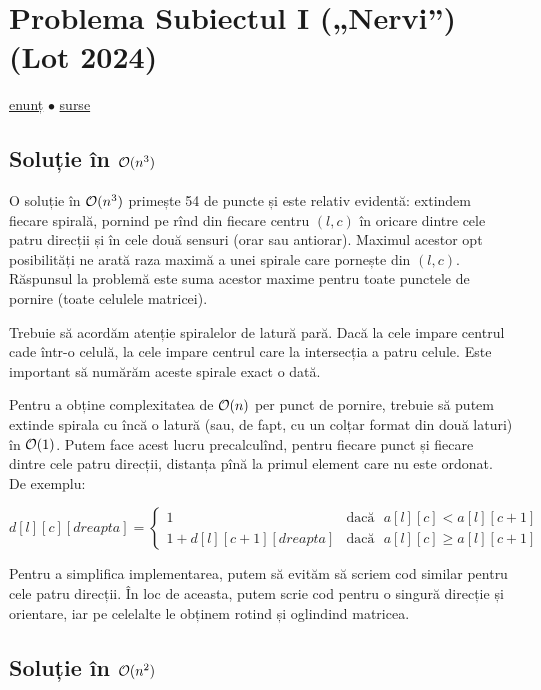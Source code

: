 \documentclass[../main.tex]{subfiles}
\begin{document}
\section{Problema Subiectul I („Nervi”) (Lot 2024)}
\label{problem:subiectul-i}

\href{https://kilonova.ro/problems/2841}{enunț}
$\bullet$
\hyperref[code:subiectul-i]{surse}

\subsection{Soluție în \texorpdfstring{$\mathcal{O}(n^3)$}{O(n3)}}

O soluție în $\mathcal{O}(n^3)$ primește 54 de puncte și este relativ evidentă: extindem fiecare spirală, pornind pe rînd din fiecare centru $(l, c)$ în oricare dintre cele patru direcții și în cele două sensuri (orar sau antiorar). Maximul acestor opt posibilități ne arată raza maximă a unei spirale care pornește din $(l, c)$. Răspunsul la problemă este suma acestor maxime pentru toate punctele de pornire (toate celulele matricei).

Trebuie să acordăm atenție spiralelor de latură pară. Dacă la cele impare centrul cade într-o celulă, la cele impare centrul care la intersecția a patru celule. Este important să numărăm aceste spirale exact o dată.

Pentru a obține complexitatea de $\mathcal{O}(n)$ per punct de pornire, trebuie să putem extinde spirala cu încă o latură (sau, de fapt, cu un colțar format din două laturi) în $\mathcal{O}(1)$. Putem face acest lucru precalculînd, pentru fiecare punct și fiecare dintre cele patru direcții, distanța pînă la primul element care nu este ordonat. De exemplu:

$$
d[l][c][dreapta] =
\begin{cases}
1 & \text{dacă} \ \ \ a[l][c] < a[l][c+1] \\
1 + d[l][c + 1][dreapta] & \text{dacă} \ \ \ a[l][c] \geq a[l][c+1]
\end{cases}
$$

Pentru a simplifica implementarea, putem să evităm să scriem cod similar pentru cele patru direcții. În loc de aceasta, putem scrie cod pentru o singură direcție și orientare, iar pe celelalte le obținem rotind și oglindind matricea.

\subsection{Soluție în \texorpdfstring{$\mathcal{O}(n^2)$}{O(n2)}}
\end{document}
